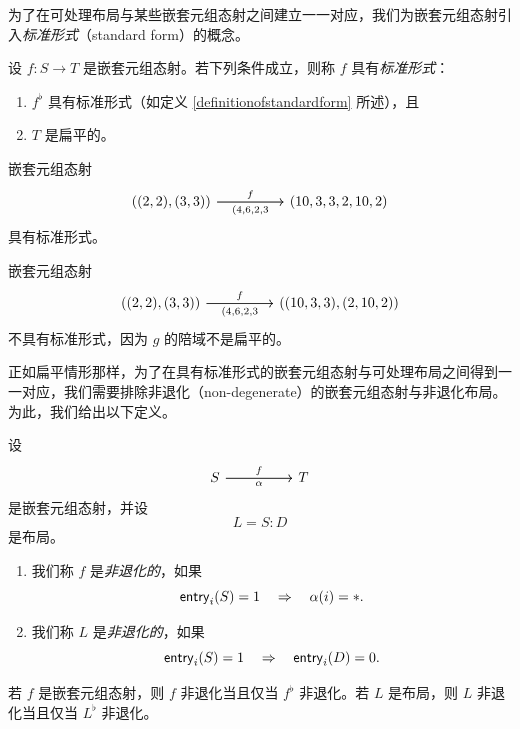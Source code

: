 为了在可处理布局与某些嵌套元组态射之间建立一一对应，我们为嵌套元组态射引入{\it 标准形式}（standard form）的概念。

\begin{definition}\label{definitionofnestedstandardform}
    设 $f:S \to T$ 是嵌套元组态射。若下列条件成立，则称 $f$ 具有{\it 标准形式}：
    \begin{enumerate}
        \item $f^\flat$ 具有标准形式（如定义 \ref{definitionofstandardform} 所述），且
        \item $T$ 是扁平的。
    \end{enumerate}
\end{definition}

\begin{example}
    嵌套元组态射
    \[\begin{tikzcd}
    ((2,2),(3,3)) \ar[rr,"f"] \ar[rr,swap,"(4{,}6{,}2{,}3"] & & (10,3,3,2,10,2)
    \end{tikzcd} \]
    具有标准形式。
\end{example}
\begin{example}
嵌套元组态射
    \[\begin{tikzcd}
    ((2,2),(3,3)) \ar[rr,"f"] \ar[rr,swap,"(4{,}6{,}2{,}3"] & & ((10,3,3),(2,10,2))
    \end{tikzcd} \]
    不具有标准形式，因为 $g$ 的陪域不是扁平的。
\end{example}

正如扁平情形那样，为了在具有标准形式的嵌套元组态射与可处理布局之间得到一一对应，我们需要排除非退化（non-degenerate）的嵌套元组态射与非退化布局。为此，我们给出以下定义。

\begin{definition}
    设
    \[
    \begin{tikzcd}
S \ar[rr,"f"] \ar[rr,swap,"\alpha"] & & T
    \end{tikzcd}
    \]
    是嵌套元组态射，并设
    \[
    L = S:D
    \]
    是布局。
    \begin{enumerate}
        \item 我们称 $f$ 是{\it 非退化的}，如果
    \[
    \mathsf{entry}_i(S) = 1 \quad \Rightarrow \quad \alpha(i) = *.
    \]
    \item 我们称 $L$ 是{\it 非退化的}，如果
    \[
    \mathsf{entry}_i(S) = 1 \quad \Rightarrow \quad \mathsf{entry}_i(D) = 0.
    \]
    \end{enumerate}
\end{definition}

\begin{remark}
    若 $f$ 是嵌套元组态射，则 $f$ 非退化当且仅当 $f^\flat$ 非退化。若 $L$ 是布局，则 $L$ 非退化当且仅当 $L^\flat$ 非退化。
\end{remark}


